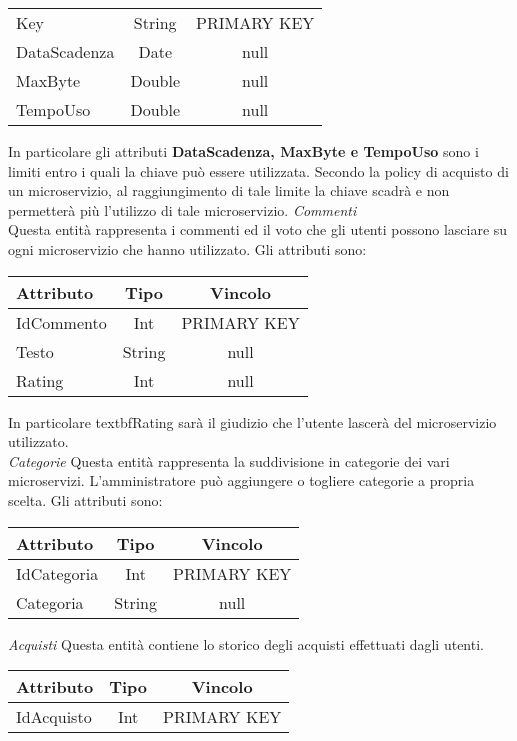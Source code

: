 {{\begin{center}
\begin{tabular}{lcc}
				Key&String&PRIMARY KEY\\
				DataScadenza&Date&null \\
				MaxByte&Double&null \\
				TempoUso&Double&null \\
			\end{tabular}
			\end{center}
			In particolare gli attributi \textbf{DataScadenza, MaxByte e TempoUso} sono i limiti entro i quali la chiave può essere utilizzata. Secondo la policy di acquisto di un microservizio, al raggiungimento di tale limite la chiave scadrà e non permetterà più l'utilizzo di tale microservizio.
			\textit{Commenti}\\
			Questa entità rappresenta i commenti ed il voto  che gli utenti possono lasciare su ogni microservizio che hanno utilizzato. Gli attributi sono:
			\begin{center}
			\begin{tabular}{lcc}
				\textbf{Attributo}&\textbf{Tipo}&\textbf{Vincolo}\\ \hline
				IdCommento&Int&PRIMARY KEY\\
				Testo&String&null \\
				Rating&Int&null \\
			\end{tabular}
			\end{center}
			In particolare textbf{Rating} sarà il giudizio che l'utente lascerà del microservizio utilizzato. \\
			
			\textit{Categorie}
			Questa entità rappresenta la suddivisione in categorie dei vari microservizi. L'amministratore può aggiungere o togliere categorie a propria scelta. Gli attributi sono: 
			\begin{center}
			\begin{tabular}{lcc}
				\textbf{Attributo}&\textbf{Tipo}&\textbf{Vincolo}\\ \hline
				IdCategoria&Int&PRIMARY KEY\\
				Categoria&String&null \\			
			\end{tabular}
			\end{center}
			
			\textit{Acquisti}
			Questa entità contiene lo storico degli acquisti effettuati dagli utenti.
			\begin{center}
			\begin{tabular}{lcc}
				\textbf{Attributo}&\textbf{Tipo}&\textbf{Vincolo}\\ \hline
				IdAcquisto&Int&PRIMARY KEY\\
			\end{tabular}
			\end{center}
}}
